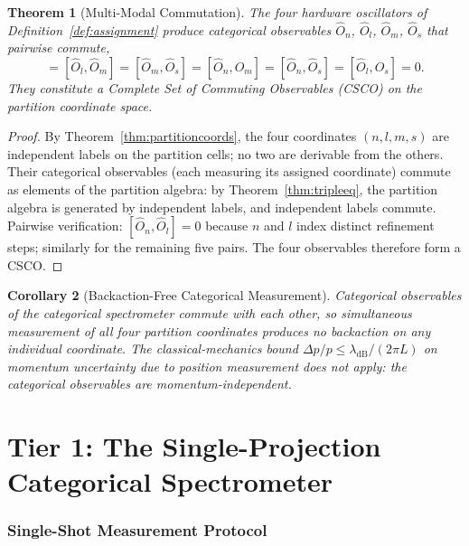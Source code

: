 \documentclass[twocolumn,11pt,a4paper]{article}
\theoremstyle{thmstyle}
\newtheorem{theorem}{Theorem}[section]
\newtheorem{corollary}[theorem]{Corollary}
\theoremstyle{axiomstyle}
\theoremstyle{definition}
\theoremstyle{remark}
\begin{document}
\begin{theorem}[Multi-Modal Commutation]\label{thm:commutation}
The four hardware oscillators of Definition~\ref{def:assignment} produce categorical observables $\hat{O}_{n}$, $\hat{O}_{l}$, $\hat{O}_{m}$, $\hat{O}_{s}$ that pairwise commute,
\begin{equation}
[\hat{O}_{n},\hat{O}_{l}]=[\hat{O}_{l},\hat{O}_{m}]=[\hat{O}_{m},\hat{O}_{s}]=[\hat{O}_{n},\hat{O}_{m}]=[\hat{O}_{n},\hat{O}_{s}]=[\hat{O}_{l},\hat{O}_{s}]=0.
\end{equation}
They constitute a Complete Set of Commuting Observables (CSCO) on the partition coordinate space.
\end{theorem}

\begin{proof}
By Theorem~\ref{thm:partitioncoords}, the four coordinates $(n,l,m,s)$ are independent labels on the partition cells; no two are derivable from the others. Their categorical observables (each measuring its assigned coordinate) commute as elements of the partition algebra: by Theorem~\ref{thm:tripleeq}, the partition algebra is generated by independent labels, and independent labels commute. Pairwise verification: $[\hat{O}_{n},\hat{O}_{l}]=0$ because $n$ and $l$ index distinct refinement steps; similarly for the remaining five pairs. The four observables therefore form a CSCO.
\end{proof}

\begin{corollary}[Backaction-Free Categorical Measurement]\label{cor:backaction}
Categorical observables of the categorical spectrometer commute with each other, so simultaneous measurement of all four partition coordinates produces no backaction on any individual coordinate. The classical-mechanics bound $\Delta p/p\leq\lambda_{\mathrm{dB}}/(2\pi L)$ on momentum uncertainty due to position measurement does not apply: the categorical observables are momentum-independent.
\end{corollary}

\part{Tier 1: The Single-Projection Categorical Spectrometer}
\label{part:tier1}

\section{Single-Shot Measurement Protocol}
\label{sec:tier1}
\end{document}
